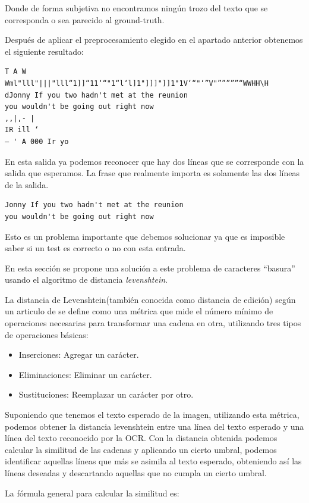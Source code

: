 Donde de forma subjetiva no encontramos ningún trozo del texto que se corresponda o sea parecido al ground-truth.

Después de aplicar el preprocesamiento elegido en el apartado anterior obtenemos el siguiente resultado:

\begin{verbatim}
T A W
Wml"lll"|||"lll“1]]“11‘“"1“l‘l]1"]]]"]]1"1V‘“"‘”V"”””””“WWHH\H
dJonny If you two hadn't met at the reunion 
you wouldn't be going out right now
,,|,- |
IR ill ‘
— ' A 000 Ir yo
\end{verbatim}

En esta salida ya podemos reconocer que hay dos líneas que se corresponde con la salida que esperamos.
La frase que realmente importa es solamente las dos líneas de la salida.
\begin{verbatim}
Jonny If you two hadn't met at the reunion
you wouldn't be going out right now
\end{verbatim}
Esto es un problema importante que debemos solucionar ya que es imposible saber si un test es correcto o no con esta entrada.

En esta sección se propone una solución a este problema de caracteres ``basura'' usando el algoritmo de distancia \emph{levenshtein}.

La distancia de Levenshtein(también conocida como distancia de edición) según un articulo de \cite{LevDistance} se define como una métrica que mide el número mínimo de operaciones necesarias para transformar una cadena en otra, utilizando tres tipos de operaciones básicas:
\begin{itemize}
\item Inserciones: Agregar un carácter.
\item Eliminaciones: Eliminar un carácter.
\item Sustituciones: Reemplazar un carácter por otro.
\end{itemize}


Suponiendo que tenemos el texto esperado de la imagen,  utilizando esta métrica, podemos obtener la distancia levenshtein entre una línea del texto esperado y una línea del texto reconocido por la OCR. Con la distancia obtenida podemos calcular la similitud de las cadenas y aplicando un cierto umbral, podemos identificar aquellas líneas que más se asimila al texto esperado, obteniendo así las líneas deseadas y descartando aquellas que no cumpla un cierto umbral.

La fórmula general para calcular la similitud es:

